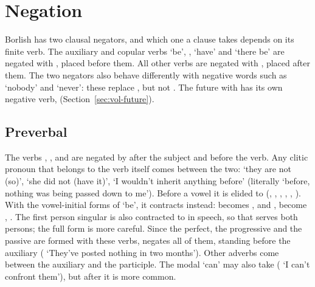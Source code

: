 \chapter{Negation}\label{ch:negation}

Borlish has two clausal negators, and which one a clause takes depends on its finite verb. The auxiliary and copular verbs  `be', ,  `have' and  `there be' are negated with , placed before them. All other verbs are negated with , placed after them. The two negators also behave differently with negative words such as  `nobody' and  `never': these replace , but not . The future with  has its own negative verb,  (Section~\ref{sec:vol-future}).

\section{Preverbal }\label{sec:neg-no}
The verbs , ,  and  are negated by  after the subject and before the verb. Any clitic pronoun that belongs to the verb itself comes between the two:  `they are not (so)',  `she did not (have it)',  `I wouldn't inherit anything before' (literally `before, nothing was being passed down to me'). Before a vowel it is elided to  (, , , , , ). With the vowel-initial forms of `be', it contracts instead:  becomes , and ,  become , . The first person singular  is also contracted to  in speech, so that  serves both persons; the full form is more careful.
Since the perfect, the progressive and the passive are formed with these verbs,  negates all of them, standing before the auxiliary ( `They've posted nothing in two months'). Other adverbs come between the auxiliary and the participle.
The modal  `can' may also take  ( `I can't confront them'), but  after it is more common.

